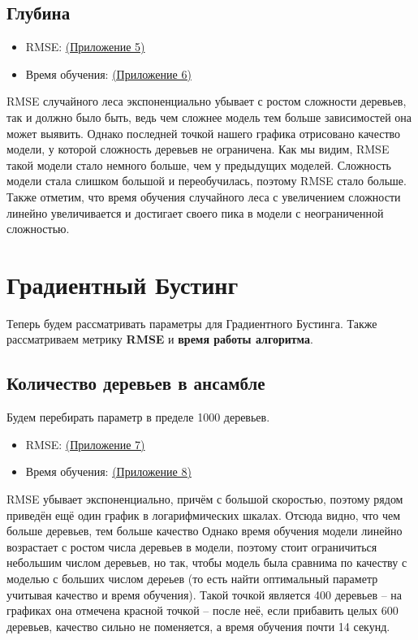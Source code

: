 \documentclass[12pt]{report}
\begin{document}
\subsection{Глубина}
\begin{itemize}
    \item RMSE: \hyperref[fig::app5]{(Приложение 5)}
    \item Время обучения: \hyperref[fig::app6]{(Приложение 6)}
\end{itemize}
RMSE случайного леса экспоненциально убывает с ростом сложности деревьев,
так и должно было быть, ведь чем сложнее модель тем больше зависимостей она может выявить.
Однако последней точкой нашего графика отрисовано качество модели, у которой сложность
деревьев не ограничена. Как мы видим, RMSE такой модели стало немного больше, 
чем у предыдущих моделей. Сложность модели стала слишком большой и переобучилась,
поэтому RMSE стало больше. Также отметим, что время обучения случайного леса с увеличением
сложности линейно увеличивается и достигает своего пика в модели с неограниченной сложностью.


\section{Градиентный Бустинг}
Теперь будем рассматривать параметры для Градиентного Бустинга. Также рассматриваем
метрику \textbf{RMSE} и \textbf{время работы алгоритма}.

\subsection{Количество деревьев в ансамбле}
Будем перебирать параметр в пределе 1000 деревьев.
\begin{itemize}
    \item RMSE: \hyperref[fig::app7]{(Приложение 7)}
    \item Время обучения: \hyperref[fig::app8]{(Приложение 8)}
\end{itemize}
RMSE убывает экспоненциально, причём с большой скоростью, поэтому рядом приведён ещё
один график в логарифмических шкалах. Отсюда видно, что чем больше деревьев, тем больше качество
Однако время обучения модели линейно возрастает с ростом числа деревьев в модели, поэтому
стоит ограничиться небольшим числом деревьев, но так, чтобы модель была сравнима по качеству
с моделью с больших числом дереьев (то есть найти оптимальный параметр учитывая качество 
и время обучения). Такой точкой является 400 деревьев -- на графиках
она отмечена красной точкой -- после неё, если прибавить целых 600 деревьев, качество сильно
не поменяется, а время обучения почти 14 секунд. \\
\end{document}
